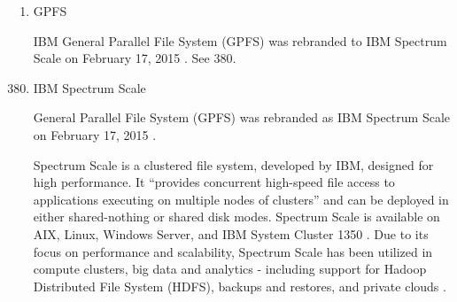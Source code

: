 \begin{enumerate}
\item {} 
GPFS

IBM General Parallel File System (GPFS) was rebranded to IBM
Spectrum Scale on February 17, 2015 \label{\detokenize{i524/technologies:id545}}{\hyperref[\detokenize{i524/technologies:www-wikigpfs}]{\sphinxcrossref{{[}469{]}}}}.
See 380.

\end{enumerate}
\begin{enumerate}
\setcounter{enumi}{379}
\item {} 
IBM Spectrum Scale

General Parallel File System (GPFS) was rebranded as IBM Spectrum
Scale on February 17, 2015 \label{\detokenize{i524/technologies:id546}}{\hyperref[\detokenize{i524/technologies:www-wikigpfs}]{\sphinxcrossref{{[}469{]}}}}.

Spectrum Scale is a clustered file system, developed by IBM,
designed for high performance. It ``provides concurrent high-speed
file access to applications executing on multiple nodes of
clusters'' \label{\detokenize{i524/technologies:id547}}{\hyperref[\detokenize{i524/technologies:www-wikigpfs}]{\sphinxcrossref{{[}469{]}}}} and can be deployed in either
shared-nothing or shared disk modes. Spectrum Scale is available
on AIX, Linux, Windows Server, and IBM System Cluster 1350
\label{\detokenize{i524/technologies:id548}}{\hyperref[\detokenize{i524/technologies:www-wikigpfs}]{\sphinxcrossref{{[}469{]}}}}.  Due to its focus on performance and
scalability, Spectrum Scale has been utilized in compute
clusters, big data and analytics - including support for Hadoop
Distributed File System (HDFS), backups and restores, and private
clouds \label{\detokenize{i524/technologies:id549}}{\hyperref[\detokenize{i524/technologies:www-spectrumscale}]{\sphinxcrossref{{[}470{]}}}}.

\end{enumerate}
